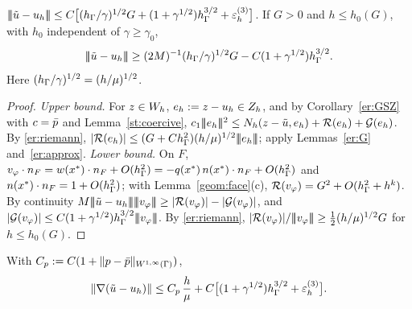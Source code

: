 \begin{theorem}\label{er:A}
$|\!|\!|\tilde u-u_h|\!|\!|\le C\bigl[(h_\Gamma/\gamma)^{1/2}G+(1+\gamma^{1/2})h_\Gamma^{3/2}+\varepsilon_h^{(3)}\bigr]$. If $G>0$ and $h\le h_0(G)$, with $h_0$ independent of $\gamma\ge\gamma_0$,
\[
|\!|\!|\tilde u-u_h|\!|\!|\ge(2M)^{-1}(h_\Gamma/\gamma)^{1/2}G-C(1+\gamma^{1/2})h_\Gamma^{3/2}.
\]
Here $(h_\Gamma/\gamma)^{1/2}=(h/\mu)^{1/2}$.
\end{theorem}

\begin{proof}
\emph{Upper bound.} For $z\in W_h$, $e_h:=z-u_h\in Z_h$, and by Corollary~\ref{er:GSZ} with $c=\bar p$ and Lemma~\ref{st:coercive}, $c_1|\!|\!|e_h|\!|\!|^2\le N_h(z-\tilde u,e_h)+\mathcal R(e_h)+\mathcal G(e_h)$. By \eqref{er:riemann}, $|\mathcal R(e_h)|\le(G+Ch_\Gamma^2)(h/\mu)^{1/2}|\!|\!|e_h|\!|\!|$; apply Lemmas~\ref{er:G} and~\ref{er:approx}.
\emph{Lower bound.} On $F$, $v_\varphi\cdot n_F=w(x^\ast)\cdot n_F+O(h_\Gamma^2)=-q(x^\ast)\,n(x^\ast)\cdot n_F+O(h_\Gamma^2)$ and $n(x^\ast)\cdot n_F=1+O(h_\Gamma^2)$; with Lemma~\ref{geom:face}(c), $\mathcal R(v_\varphi)=G^2+O(h_\Gamma^2+h^k)$. By continuity $M\tnorm{\ut-u_h}\tnorm{v_\varphi}\ge|\Rc(v_\varphi)|-|\Gc(v_\varphi)|$, and $|\mathcal G(v_\varphi)|\le C(1+\gamma^{1/2})h_\Gamma^{3/2}|\!|\!|v_\varphi|\!|\!|$. By \eqref{er:riemann}, $|\mathcal R(v_\varphi)|/|\!|\!|v_\varphi|\!|\!|\ge\frac12(h/\mu)^{1/2}G$ for $h\le h_0(G)$.
\end{proof}

\begin{theorem}[$\GS$: $H^1$ rate $1$]\label{er:C}
With $C_p:=C(1+\lVert p-\bar p\rVert_{W^{1,\infty}(\Gamma)})$,
\[
\lVert \nabla(\tilde u-u_h)\rVert\le C_p\,\frac h\mu+C\bigl[(1+\gamma^{1/2})h_\Gamma^{3/2}+\varepsilon_h^{(3)}\bigr].
\]
\end{theorem}

